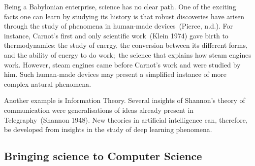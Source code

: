 \documentclass[
  a4paperpaper,
  a4paper,
  12pt,
  twoside,
  brazil,
  british,
  open=right]{scrbook}
\begin{document}
Being a Babylonian enterprise, science has no clear path. One of the
exciting facts one can learn by studying its history is that robust
discoveries have arisen through the study of phenomena in human-made
devices~(Pierce,
n.d.).
For instance, Carnot's first and only scientific work~(Klein
1974)
gave birth to thermodynamics: the study of energy, the conversion
between its different forms, and the ability of energy to do work;~the
science that explains how steam engines work. However, steam engines
came before Carnot's work and were studied by him. Such human-made
devices may present a simplified instance of more complex natural
phenomena.

Another example is Information Theory. Several insights of Shannon's
theory of communication were generalisations of ideas already present in
Telegraphy~(Shannon
1948).
New theories in artificial intelligence can, therefore, be developed
from insights in the study of deep learning phenomena.

\hypertarget{sec:bringing_science}{%
\subsection{Bringing science to Computer
Science}\label{sec:bringing_science}}
\end{document}
